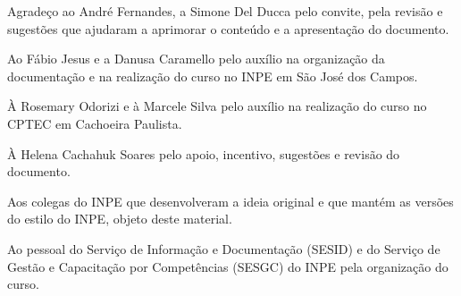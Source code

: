 \begin{agradecimentos}
\hypertarget{estilo:agradecimentos}{} 
Agradeço ao André Fernandes, a Simone Del Ducca pelo convite, pela revisão e sugestões que ajudaram a aprimorar  o conteúdo e a apresentação do documento. 

Ao Fábio Jesus e a Danusa Caramello pelo auxílio na organização da documentação e na realização do curso no INPE em São José dos Campos. 

À Rosemary Odorizi e à Marcele Silva pelo auxílio na realização do curso no CPTEC em Cachoeira Paulista.

À Helena Cachahuk Soares pelo apoio, incentivo, sugestões e revisão do documento.

Aos colegas do INPE que desenvolveram a ideia original e que mantém as versões do estilo do INPE, objeto deste material.

Ao pessoal do Serviço de Informação e Documentação (SESID) e do Serviço de Gestão e Capacitação por Competências (SESGC) do INPE pela organização do curso.
\end{agradecimentos}
